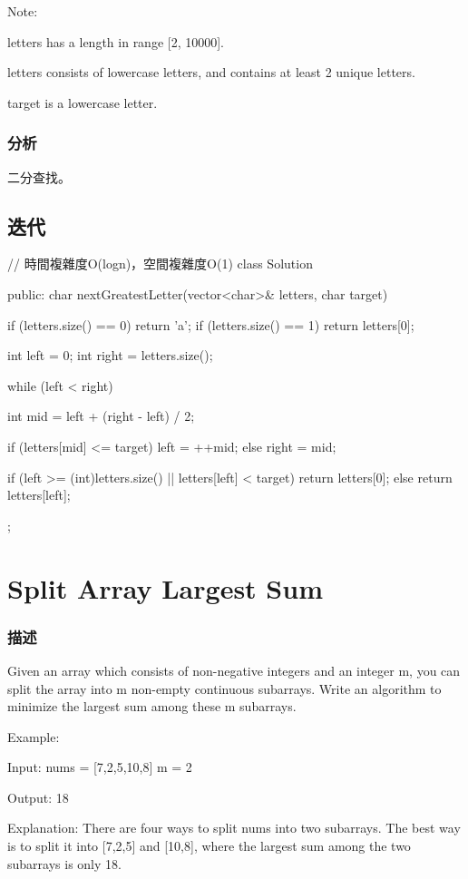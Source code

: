 Note:
\begindot
\item letters has a length in range [2, 10000].
\item letters consists of lowercase letters, and contains at least 2 unique letters.
\item target is a lowercase letter.
\myenddot


\subsubsection{分析}
二分查找。


\subsection{迭代}
\begin{Code}
// 時間複雜度O(logn)，空間複雜度O(1)
class Solution {
public:
    char nextGreatestLetter(vector<char>& letters, char target) {
        if (letters.size() == 0) return 'a';
        if (letters.size() == 1) return letters[0];

        int left = 0;
        int right = letters.size();

        while (left < right) {
            int mid = left + (right - left) / 2;

            if (letters[mid] <= target)
                left = ++mid;
            else
                right = mid;
        }

        if (left >= (int)letters.size() || letters[left] < target)
            return letters[0];
        else
            return letters[left];
    }
};
\end{Code}

\section{Split Array Largest Sum} %
\label{sec:split-array-largest-sum}


\subsubsection{描述}
Given an array which consists of non-negative integers and an integer m, you can split the array into m non-empty continuous subarrays. Write an algorithm to minimize the largest sum among these m subarrays.

Example:
\begin{Code}
Input:
nums = [7,2,5,10,8]
m = 2

Output:
18

Explanation:
There are four ways to split nums into two subarrays.
The best way is to split it into [7,2,5] and [10,8],
where the largest sum among the two subarrays is only 18.
\end{Code}

